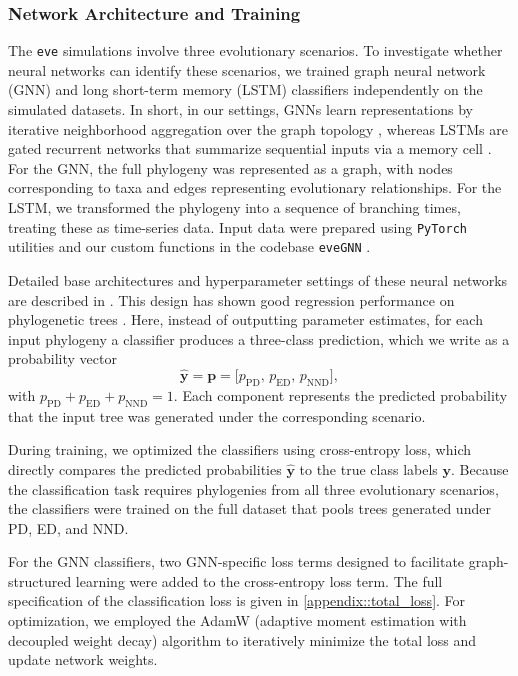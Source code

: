 {\subsubsection{Network Architecture and Training}
\label{ch3::sec::methods::classification::architecture}
The \texttt{eve} simulations involve three evolutionary scenarios. To investigate whether neural networks can identify these scenarios, we trained graph neural network (GNN) and long short-term memory (LSTM) classifiers independently on the simulated datasets. In short, in our settings, GNNs learn representations by iterative neighborhood aggregation over the graph topology \citep{kipf_semi-supervised_2016}, whereas LSTMs are gated recurrent networks that summarize sequential inputs via a memory cell \citep{sak_long_2014}. For the GNN, the full phylogeny was represented as a graph, with nodes corresponding to taxa and edges representing evolutionary relationships. For the LSTM, we transformed the phylogeny into a sequence of branching times, treating these as time-series data. Input data were prepared using \texttt{PyTorch} utilities and our custom functions in the codebase \texttt{eveGNN} \citep{qin_evegnn_2023}. 

Detailed base architectures and hyperparameter settings of these neural networks are described in \citet{qin_parameter_2025}. This design has shown good regression performance on phylogenetic trees \citep{qin_parameter_2025}. Here, instead of outputting parameter estimates, for each input phylogeny a classifier produces a three-class prediction, which we write as a probability vector
\begin{equation}
\mathbf{\hat{y}} = \mathbf{p} = \bigl[p_{\text{PD}}, \, p_{\text{ED}}, \, p_{\text{NND}}\bigr],
\end{equation}
with \(p_{\text{PD}} + p_{\text{ED}} + p_{\text{NND}} = 1\). Each component represents the predicted probability that the input tree was generated under the corresponding scenario.

During training, we optimized the classifiers using cross-entropy loss, which directly compares the predicted probabilities \(\mathbf{\hat{y}}\) to the true class labels \(\mathbf{y}\). Because the classification task requires phylogenies from all three evolutionary scenarios, the classifiers were trained on the full dataset that pools trees generated under PD, ED, and NND. 

For the GNN classifiers, two GNN-specific loss terms designed to facilitate graph-structured learning were added to the cross-entropy loss term. The full specification of the classification loss is given in \autoref{appendix::total_loss}. For optimization, we employed the AdamW (adaptive moment estimation with decoupled weight decay) algorithm \citep{loshchilov_decoupled_2017} to iteratively minimize the total loss and update network weights.

}
